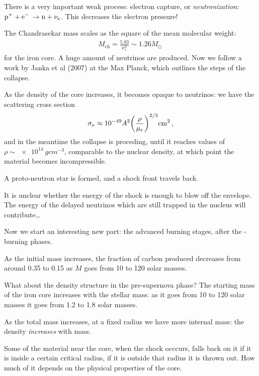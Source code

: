 \documentclass[main.tex]{subfiles}
\begin{document}
There is a very important weak process: electron capture, or \emph{neutronization}: \(\ce{p+ + e- \rightarrow n +} \nu_{e}\). This decreases the electron pressure!

The Chandrasekar mass scales as the square of the mean molecular weight: 
%
\begin{align}
  M _{\text{ch}} = \frac{5.83}{\mu_{e}^2} \sim 1.26 M_{\odot}
\,
\end{align}
%
for the iron core. A huge amount of neutrinos are produced. 
Now we follow a work by Janka et al (2007) at the Max Planck, which outlines the steps of the collapse. 

As the density of the core increases, it becomes opaque to neutrinos: we have the scattering cross section 
%
\begin{align}
  \sigma_{\nu } \approx \num{e-49} A^2 \qty(\frac{\rho }{\mu_{e}})^{2/3} \SI{}{cm^2}
\,,
\end{align}
%
and in the meantime the collapse is proceding, until it reaches values of \(\rho \sim \SI{e14}{g cm^{-3}}\), comparable to the nuclear density, at which point the material becomes incompressible. 

A proto-neutron star is formed, and a shock front travels back. 


It is unclear whether the energy of the shock is enough to blow off the envelope. The energy of the delayed neutrinos which are still trapped in the nucleus will contribute\dots

Now we start an interesting new part: the advanced burning stages, after the -burning phases. 

As the initial mass increases, the fraction of carbon produced decreases from around \num{.35} to \num{.15} as \(M\) goes from 10 to 120 solar masses. 

What about the density structure in the pre-supernova phase? 
The starting mass of the iron core increases with the stellar mass: as it goes from 10 to 120 solar masses it goes from 1.2 to 1.8 solar masses. 

As the total mass increases, at a fixed radius we have more internal mass: the density \emph{increases} with mass. 

Some of the material near the core, when the shock occcurs, falls back on it if it is inside a certain critical radius, if it is outside that radius it is thrown out. 
How much of it depends on the physical properties of the core. 
\end{document}
